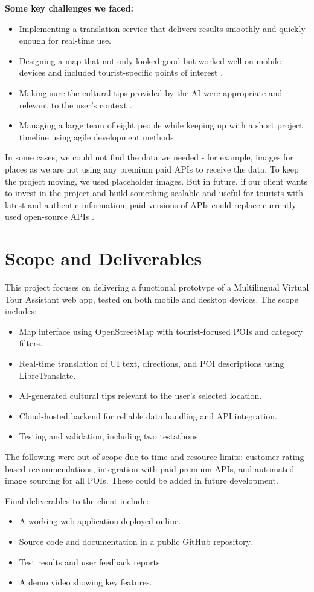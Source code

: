 \textbf{Some key challenges we faced:}
\begin{itemize}
  \item Implementing a translation service that delivers results smoothly and quickly enough for real-time use.
  \item Designing a map that not only looked good but worked well on mobile devices and included tourist-specific points of interest \cite{uxTourism}.
  \item Making sure the cultural tips provided by the AI were appropriate and relevant to the user’s context \cite{aiBias}.
  \item Managing a large team of eight people while keeping up with a short project timeline using agile development methods \cite{agileTeams}.
\end{itemize}

In some cases, we could not find the data we needed - for example, images for places as we are not using any premium paid APIs to receive the data. To keep the project moving, we used placeholder images. But in future, if our client wants to invest in the project and build something scalable and useful for tourists with latest and authentic information, paid versions of APIs could replace currently used open-source APIs \cite{crowdsourcing}.

\section{Scope and Deliverables}
This project focuses on delivering a functional prototype of a Multilingual Virtual Tour Assistant web app, tested on both mobile and desktop devices. The scope includes:
\begin{itemize}
\item Map interface using OpenStreetMap with tourist-focused POIs and category filters.
\item Real-time translation of UI text, directions, and POI descriptions using LibreTranslate.
\item AI-generated cultural tips relevant to the user’s selected location.
\item Cloud-hosted backend for reliable data handling and API integration.
\item Testing and validation, including two testathons.
\end{itemize}

The following were out of scope due to time and resource limits: customer rating based recommendations, integration with paid premium APIs, and automated image sourcing for all POIs. These could be added in future development.

Final deliverables to the client include:
\begin{itemize}
\item A working web application deployed online.
\item Source code and documentation in a public GitHub repository.
\item Test results and user feedback reports.
\item A demo video showing key features.
\end{itemize}
